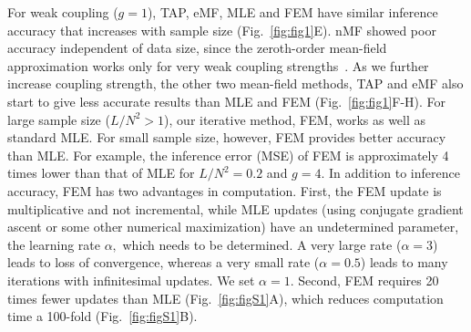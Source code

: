 \documentclass[prx,twocolumn,twoside,showpacs,superscriptaddress]{revtex4-1}
\begin{document}
For weak coupling ($g=1$), TAP, eMF, MLE and FEM have similar inference accuracy that increases with sample size (Fig.~\ref{fig:fig1}E).
nMF showed poor accuracy independent of data size, since the zeroth-order mean-field approximation works only for very weak coupling strengths~\cite{Roudi2011}.
As we further increase coupling strength, the other two mean-field methods, TAP and eMF also start to give less accurate results than MLE and FEM (Fig.~\ref{fig:fig1}F-H). 
For large sample size ($L/N^2>1$), our iterative method, FEM, works as well as standard MLE. For small sample size, however, FEM provides better accuracy than MLE.
For example, the inference error (MSE) of FEM is approximately 4 times lower than that of MLE for $L/N^2=0.2$ and $g=4.$
In addition to inference accuracy, FEM has two advantages in computation. %
First, the FEM update is multiplicative and not incremental, while MLE updates (using conjugate gradient ascent or some other numerical maximization) have an undetermined parameter, the learning rate $\alpha,$ which needs to be determined.
A very large rate ($\alpha=3$) leads to loss of convergence, whereas a very small rate ($\alpha=0.5$) leads to many iterations with infinitesimal updates. We set $\alpha=1$.
Second, FEM requires 20 times fewer updates than MLE (Fig.~\ref{fig:figS1}A), which reduces computation time a 100-fold (Fig.~\ref{fig:figS1}B).
\end{document}
